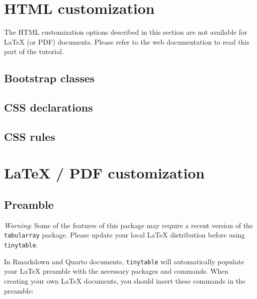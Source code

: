 \documentclass[
  letterpaper,
  DIV=11,
  numbers=noendperiod]{scrartcl}
\begin{document}
\section{HTML customization}\label{html-customization}

The HTML customization options described in this section are not
available for LaTeX (or PDF) documents. Please refer to the web
documentation to read this part of the tutorial.

\subsection{Bootstrap classes}\label{bootstrap-classes}

\subsection{CSS declarations}\label{css-declarations}

\subsection{CSS rules}\label{css-rules}

\section{LaTeX / PDF customization}\label{sec-tabularray}

\subsection{Preamble}\label{preamble}

\emph{Warning}: Some of the features of this package may require a
recent version of the \texttt{tabularray} package. Please update your
local LaTeX distribution before using \texttt{tinytable}.

In Rmarkdown and Quarto documents, \texttt{tinytable} will automatically
populate your LaTeX preamble with the necessary packages and commands.
When creating your own LaTeX documents, you should insert these commands
in the preamble:
\end{document}
